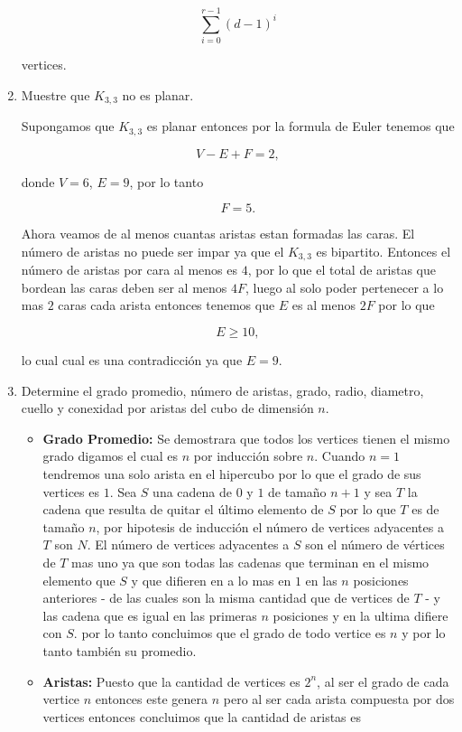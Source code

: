 \documentclass[letterpaper]{article}
\newcommand{\pars}[1]{\left( #1 \right) }
\newcommand{\1}{\mathbbm{1}}
\begin{document}
\begin{enumerate}
		\[\sum_{i=0}^{r-1} \pars{d-1}^i\]

		vertices.

		\item Muestre que $K_{3,3}$ no es planar.
		
		Supongamos que $K_{3,3}$ es planar entonces por la formula de Euler tenemos que

		\[V-E+F=2,\]

		donde $V = 6$, $E = 9$, por lo tanto

		\[F = 5.\]

		Ahora veamos de al menos cuantas aristas estan formadas las caras. El número de aristas no puede ser impar ya que el $K_{3,3}$ es bipartito. Entonces el número de aristas por cara al menos es $4$, por lo que el total de aristas que bordean las caras deben ser al menos $4F$, luego al solo poder pertenecer a lo mas $2$ caras cada arista entonces tenemos que $E$ es al menos $2F$ por lo que

		\[E \geq 10,\]

		lo cual cual es una contradicción ya que $E = 9$.

		\item Determine el grado promedio, número de aristas, grado, radio, diametro, cuello y conexidad por aristas del cubo de dimensión $n$.

		\begin{itemize}
			\item \textbf{Grado Promedio:} Se demostrara que todos los vertices tienen el mismo grado digamos el cual es $n$ por inducción sobre $n$.
			Cuando $n = 1$ tendremos una solo arista en el hipercubo por lo que el grado de sus vertices es $1$. Sea $S$ una cadena de $0$ y $1$ de tamaño $n+1$ y sea $T$ la cadena que resulta de quitar el último elemento de $S$ por lo que $T$ es de tamaño $n$, por hipotesis de inducción el número de vertices adyacentes a $T$ son $N$. El número de vertices adyacentes a $S$ son el número de vértices de $T$ mas uno ya que son todas las cadenas que terminan en el mismo elemento que $S$ y que difieren en a lo mas en $1$ en las $n$ posiciones anteriores - de las cuales son la misma cantidad que de vertices de $T$ - y las cadena que es igual en las primeras $n$ posiciones y en la ultima difiere con $S$. por lo tanto concluimos que el grado de todo vertice es $n$ y por lo tanto también su promedio.
			\item \textbf{Aristas:} Puesto que la cantidad de vertices es $2^n$, al ser el grado de cada vertice $n$ entonces este genera $n$ pero al ser cada arista compuesta por dos vertices entonces concluimos que la cantidad de aristas es
			

\end{itemize}
\end{enumerate}
\end{document}
